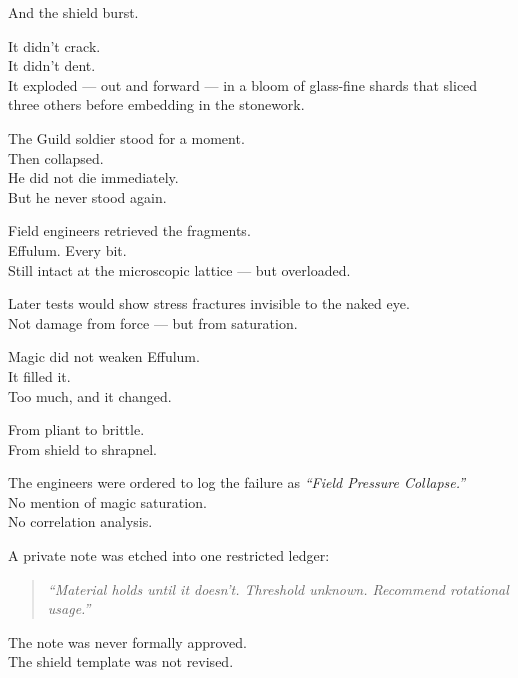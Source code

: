 \documentclass[12pt]{article}
\begin{document}
And the shield burst.

\vspace{1em}

It didn’t crack.\\
It didn’t dent.\\
It exploded — out and forward — in a bloom of glass-fine shards that sliced three others before embedding in the stonework.

The Guild soldier stood for a moment.\\
Then collapsed.\\
He did not die immediately.\\
But he never stood again.

\vspace{1em}

Field engineers retrieved the fragments.\\
Effulum. Every bit.\\
Still intact at the microscopic lattice — but overloaded.

Later tests would show stress fractures invisible to the naked eye.\\
Not damage from force — but from saturation.

\vspace{1em}

Magic did not weaken Effulum.\\
It filled it.\\
Too much, and it changed.

From pliant to brittle.\\
From shield to shrapnel.

\vspace{1em}

The engineers were ordered to log the failure as \textit{“Field Pressure Collapse.”}\\
No mention of magic saturation.\\
No correlation analysis.

A private note was etched into one restricted ledger:

\begin{quote}
\textit{“Material holds until it doesn’t. Threshold unknown. Recommend rotational usage.”}
\end{quote}

The note was never formally approved.\\
The shield template was not revised.

\vspace{1em}
\end{document}
